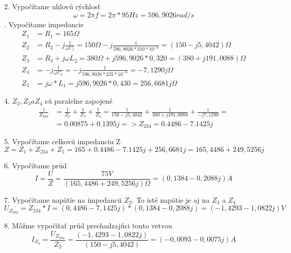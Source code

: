 \documentclass[a4paper,12pt]{article}
\begin{document}
2. Vypočítame uhlovú rýchlosť
\begin {equation*}
	\omega = 2\pi f = 2\pi * 95Hz = 596,9026 rad/s
\end {equation*}
. Vypočítame impedancie
\begin {equation*}
    \begin{split}
	Z_1 &= R_1 = 165\Omega \\
	Z_2 &= R_2 - j\frac{1}{\omega C_1} = 150\Omega - j\frac{1}{596,9026*310*10^{-6}} = (150-j5,4042)\Omega \\
	Z_3 &= R_3 + j\omega L_2 =380\Omega + j596,9026 * 0,320 = (380 + j191,0088)\Omega \\
	Z_4 &= -j\frac{1}{\omega C_2} = -j \frac{1}{596,9026*235*10^{-6}} = -7,1290j \Omega \\
	Z_5 &= j\omega * L_1 = j596,9026 * 0,430 = 256,6681j  \Omega
    \end{split}
\end {equation*}

4. $Z_2, Z_3  a  Z_4$ sú paralelne zapojené
\begin{equation*}
\begin{split}
\frac{1}{Z_{234}} &= \frac{1}{Z_2} + \frac{1}{Z_3} + \frac{1}{Z_4} = \frac{1}{150-j5,4042} + \frac{1}{380 + j191,0088} + \frac{1}{-j7,1290} = \\
&= 0.00875 + 0.1395j => Z_{234} = 0.4486 - 7.1425j
\end{split}
\end{equation*}

5. Vypočítame celkovú impedanciu Z
\begin{equation*}
Z = Z_1 + Z_{234} + Z_5 = 165 + 0.4486 - 7.1425j +   256,6681j = 165,4486 + 249,5256j
\end{equation*}

6. Vypočítame prúd
\begin{equation*}
I = \frac{U}{Z} = \frac{75V}{(165,4486 + 249,5256j)\Omega} = (0,1384 - 0,2088j) A
\end{equation*}

7. Vypočítame napätie na impedancii $Z_2$. To isté napätie je aj na $Z_3$ a $Z_4$
\begin{equation*}
U_{Z_{234}} = Z_{234} * I = (0,4486 - 7,1425j) *  (0,1384 - 0,2088j) = (-1,4293-1,0822j) V
\end{equation*}

8. Môžme vypočítať prúd prechadzajúci touto vetvou
\begin{equation*}
I_{Z_2} = \frac{U_{Z_{234}}}{Z_2} = \frac{(-1,4293-1,0822j)}{(150-j5,4042)} = (-0,0093 - 0,0075j) A
\end{equation*}
\end{document}
